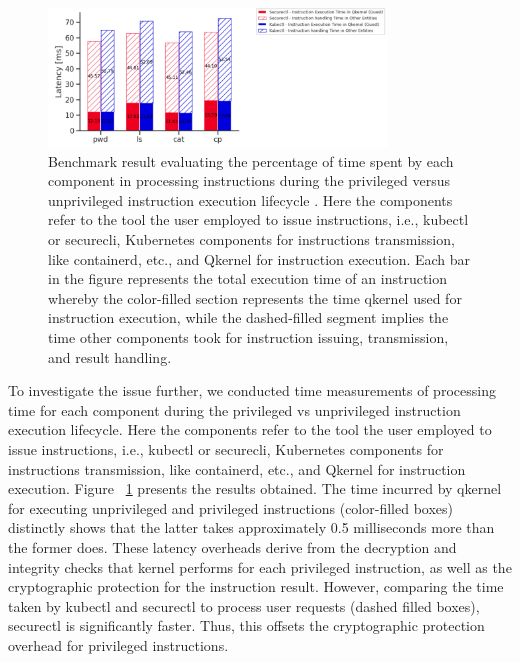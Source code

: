 \begin{figure}[H]
    \centering
    \includegraphics[width=0.8\textwidth]{images/timeshare_issuing_cmd_in_cquark_kubectl_securectl.PNG}
    \caption[Benchmark result - The processing time for components during the privileged vs unprivileged instruction execution lifecycle]{Benchmark result evaluating the percentage of time spent by each component in processing instructions during the privileged versus unprivileged instruction 
    execution lifecycle . Here the components refer to the tool the user employed to issue instructions, i.e., kubectl or securecli,  Kubernetes components for instructions transmission, like containerd, etc., and Qkernel for instruction execution.  Each bar in the 
    figure represents the total execution time of an instruction whereby the color-filled section represents the time qkernel used for instruction execution, while the dashed-filled segment implies the time other components took for instruction issuing, transmission, and result handling.
    }
    \label{fig:timeshare_issuing_cmd_in_cquark_kubectl_securectl}
\end{figure}

To investigate the issue further, we conducted time  measurements of processing time for each component during the privileged vs unprivileged instruction execution lifecycle. Here the components refer to the tool the user employed 
to issue instructions, i.e., kubectl or securecli,  Kubernetes components for instructions transmission, like containerd, etc., and Qkernel for instruction execution.
Figure ~\ref{fig:timeshare_issuing_cmd_in_cquark_kubectl_securectl} presents the results obtained. The time incurred by qkernel for executing unprivileged and privileged instructions (color-filled boxes) distinctly shows that the latter takes approximately 0.5 milliseconds more than the former does. These latency overheads derive from the decryption and 
integrity checks that kernel performs for each privileged instruction, as well as the cryptographic protection for the instruction result. However, comparing the time taken by kubectl and securectl to process user requests (dashed filled boxes), securectl is significantly faster. Thus, this 
offsets the cryptographic protection overhead for privileged instructions.


\cleardoublepage

